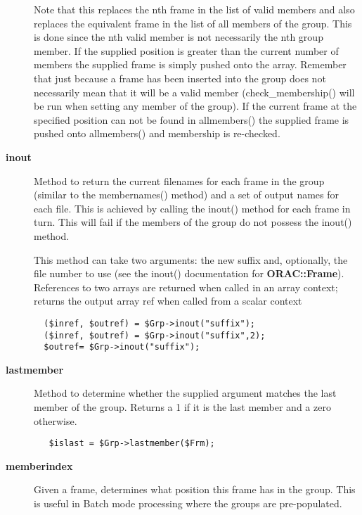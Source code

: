 \begin{description}
Note that this replaces the nth frame in the list of valid members and
also replaces the equivalent frame in the list of all members of the
group. This is done since the nth valid member is not necessarily the
nth group member. If the supplied position is greater than the current
number of members the supplied frame is simply pushed onto the
array. Remember that just because a frame has been inserted into the
group does not necessarily mean that it will be a valid member
(check\_membership() will be run when setting any member of the group).
If the current frame at the specified position can not be found in
allmembers() the supplied frame is pushed onto allmembers() and
membership is re-checked.


\item[\textbf{inout}] \mbox{}

Method to return the current filenames for each frame in the
group (similar to the membernames() method) and a set of output
names for each file. This is achieved by calling the inout()
method for each frame in turn. This will fail if the members of the
group do not possess the inout() method.



This method can take two arguments: the new suffix and, optionally,
the file number to use (see the inout() documentation for
\textbf{ORAC::Frame}). References to two arrays are returned when called
in an array context; returns the output array ref when called
from a scalar context

\begin{verbatim}
  ($inref, $outref) = $Grp->inout("suffix");
  ($inref, $outref) = $Grp->inout("suffix",2);
  $outref= $Grp->inout("suffix");
\end{verbatim}

\item[\textbf{lastmember}] \mbox{}

Method to determine whether the supplied argument
matches the last member of the group. Returns a 1 if
it is the last member and a zero otherwise.

\begin{verbatim}
   $islast = $Grp->lastmember($Frm);
\end{verbatim}

\item[\textbf{memberindex}] \mbox{}

Given a frame, determines what position this frame has in the
group. This is useful in Batch mode processing where the
groups are pre-populated.


\end{description}
